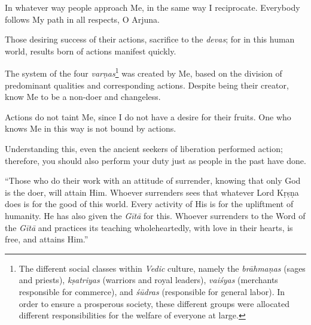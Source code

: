 {In whatever way people approach Me, in the same way I reciprocate. Everybody follows My path in all respects, O Arjuna.}

{Those desiring success of their actions, sacrifice to the \textit{devas}; for in this human world, results born of actions manifest quickly.}

{The system of the four \textit{varṇas}\footnote{The different social classes within \textit{Vedic} culture, namely the \textit{brāhmaṇas} (sages and priests), \textit{kṣatriyas} (warriors and royal leaders), \textit{vaiśyas} (merchants responsible for commerce), and \textit{śūdras} (responsible for general labor). In order to ensure a prosperous society, these different groups were allocated different responsibilities for the welfare of everyone at large.} was created by Me, based on the division of predominant qualities and corresponding actions. Despite being their creator, know Me to be a non-doer and changeless.}

{Actions do not taint Me, since I do not have a desire for their fruits. One who knows Me in this way is not bound by actions.}

{Understanding this, even the ancient seekers of liberation performed action; therefore, you should also perform your duty just as people in the past have done.}

\enquote{Those who do their work with an attitude of surrender, knowing that only God is the doer, will attain Him. Whoever surrenders sees that whatever Lord Kṛṣṇa does is for the good of this world. Every activity of His is for the upliftment of humanity. He has also given the \textit{Gītā} for this. Whoever surrenders to the Word of the \textit{Gītā} and practices its teaching wholeheartedly, with love in their hearts, is free, and attains Him.}

